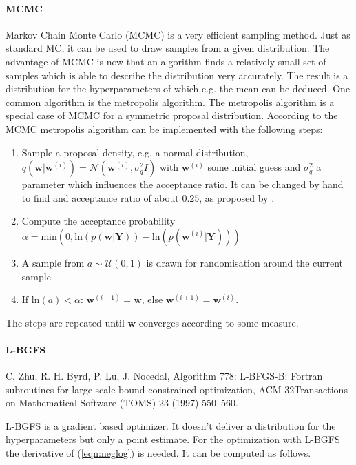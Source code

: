 \documentclass[%
  a4paper,oneside,%
  11pt,%
  smallchapters,
  style=printdev,
  extramargin,
  green,%
  rgb, <cmyk>
  ]{tubsbook}
\begin{document}
\paragraph{MCMC}
Markov Chain Monte Carlo (MCMC) is a very efficient sampling method. Just as standard MC, it can be used to draw samples from a given distribution. The advantage of MCMC is now that an algorithm finds a relatively small set of samples which is able to describe the distribution very accurately. The result is a distribution for the hyperparameters of which e.g. the mean can be deduced. One common algorithm is the metropolis algorithm.
The metropolis algorithm is a special case of MCMC for a symmetric proposal distribution.
According to \cite[p.31]{girolami2021} the MCMC metropolis algorithm can be implemented with the following steps:
\begin{enumerate}
\item Sample a proposal density, e.g. a normal distribution, $q(\bm{w}|\bm{w}^{(i)}) = \mathcal{N}(\bm{w}^{(i)},\sigma^2_q I)$ with $\bm{w}^{(i)}$ some initial guess and $\sigma^2_q$ a parameter which influences the acceptance ratio. It can be changed by hand to find and acceptance ratio of about $0.25$, as proposed by \cite{girolami2021}.
\item Compute the acceptance probability $\alpha = \mathrm{min}(0,\mathrm{ln}(p(\bm{w}|\bm{Y}))  - \mathrm{ln}(p(\bm{w}^{(i)}|\bm{Y})))$

\item A sample from $a \sim \mathcal{U}(0,1)$ is drawn for randomisation around the current sample
\item If $\mathrm{ln}(a)<\alpha$: $\bm{w}^{(i+1)} = \bm{w}$, else $\bm{w}^{(i+1)} = \bm{w}^{(i)}$. 
\end{enumerate}
The steps are repeated until $\bm{w}$ converges according to some measure.



\paragraph{L-BGFS}
C. Zhu, R. H. Byrd, P. Lu, J. Nocedal, Algorithm 778: L-BFGS-B: Fortran subroutines for large-scale bound-constrained optimization, ACM
32Transactions on Mathematical Software (TOMS) 23 (1997) 550–560.

L-BGFS is a gradient based optimizer. It doesn't deliver a distribution for the hyperparameters but only a point estimate.
For the optimization with L-BGFS the derivative of (\ref{eqn:neglog}) is needed. It can be computed as follows.
\end{document}
